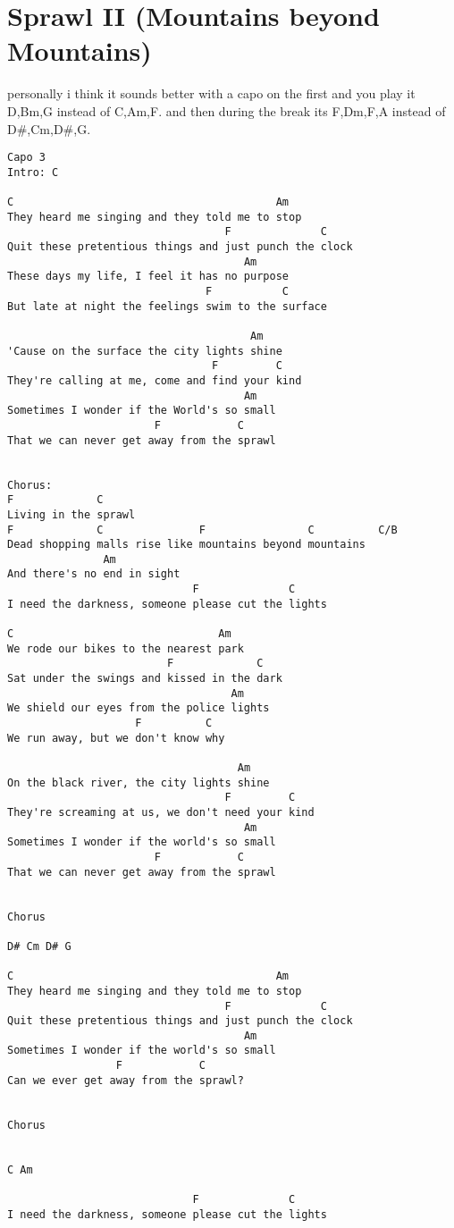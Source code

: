 \documentclass[leqno]{memoir}
\begin{document}
\chapter{Sprawl II (Mountains beyond Mountains)}
personally i think it sounds better with a capo on the first and you play it D,Bm,G instead of C,Am,F. and then during the break its F,Dm,F,A instead of D\#,Cm,D\#,G.
\begin{verbatim}
Capo 3
Intro: C

C                                         Am
They heard me singing and they told me to stop
                                  F              C
Quit these pretentious things and just punch the clock
                                     Am
These days my life, I feel it has no purpose
                               F           C
But late at night the feelings swim to the surface

                                      Am
'Cause on the surface the city lights shine
                                F         C
They're calling at me, come and find your kind
                                     Am
Sometimes I wonder if the World's so small
                       F            C
That we can never get away from the sprawl


Chorus:
F             C
Living in the sprawl
F             C               F                C          C/B
Dead shopping malls rise like mountains beyond mountains
               Am
And there's no end in sight
                             F              C
I need the darkness, someone please cut the lights

C                                Am
We rode our bikes to the nearest park
                         F             C
Sat under the swings and kissed in the dark
                                   Am
We shield our eyes from the police lights
                    F          C
We run away, but we don't know why

                                    Am
On the black river, the city lights shine
                                  F         C
They're screaming at us, we don't need your kind
                                     Am
Sometimes I wonder if the world's so small
                       F            C
That we can never get away from the sprawl


Chorus

D# Cm D# G

C                                         Am
They heard me singing and they told me to stop
                                  F              C
Quit these pretentious things and just punch the clock
                                     Am
Sometimes I wonder if the world's so small
                 F            C
Can we ever get away from the sprawl?


Chorus


C Am

                             F              C
I need the darkness, someone please cut the lights
\end{verbatim}
\newpage
\end{document}
